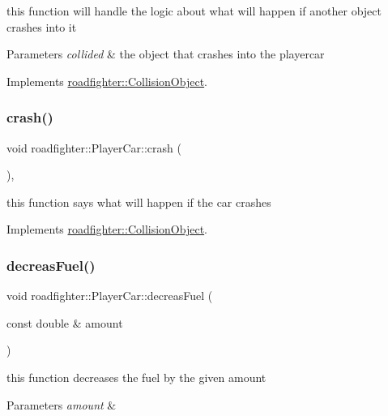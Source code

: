 this function will handle the logic about what will happen if another object crashes into it 
\begin{DoxyParams}{Parameters}
{\em collided} & the object that crashes into the playercar \\
\hline
\end{DoxyParams}


Implements \hyperlink{classroadfighter_1_1CollisionObject_a7eafa2fdc4463788b816fdd9370d28d9}{roadfighter\+::\+Collision\+Object}.

\mbox{\label{classroadfighter_1_1PlayerCar_a330d071af729d7afbfcfd7ef92516544}} 
\subsubsection{\texorpdfstring{crash()}{crash()}}
{\footnotesize\ttfamily void roadfighter\+::\+Player\+Car\+::crash (\begin{DoxyParamCaption}{ }\end{DoxyParamCaption})\hspace{0.3cm}{\ttfamily [override]}, {\ttfamily [virtual]}}

this function says what will happen if the car crashes 

Implements \hyperlink{classroadfighter_1_1CollisionObject_a18f0f60a5a664d6fb554daac0d398a2c}{roadfighter\+::\+Collision\+Object}.

\mbox{\label{classroadfighter_1_1PlayerCar_a3e0ac4c28d1635e5d142c81beeec05dc}} 
\subsubsection{\texorpdfstring{decreas\+Fuel()}{decreaseFuel()}}
{\footnotesize\ttfamily void roadfighter\+::\+Player\+Car\+::decreas\+Fuel (\begin{DoxyParamCaption}\item[{const double \&}]{amount }\end{DoxyParamCaption})}

this function decreases the fuel by the given amount 
\begin{DoxyParams}{Parameters}
{\em amount} & \\
\hline
\end{DoxyParams}
\mbox{\label{classroadfighter_1_1PlayerCar_aefc7f96fae66baecef10861a6b1fa0f2}} 
